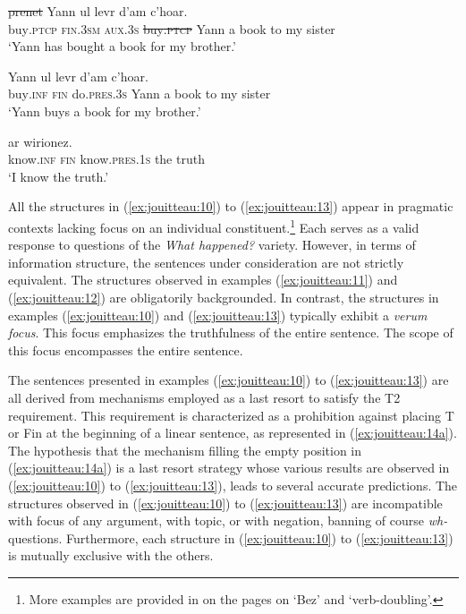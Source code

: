 \documentclass[output=paper,colorlinks,citecolor=brown]{langscibook}
\begin{document}
\ea \label{ex:jouitteau:11}
    \gll {} {}      {}     \sout{prenet}             Yann    ul levr   d'am   c’hoar. \\
        buy\textsc{.ptcp} \textsc{fin.3sm} \textsc{aux.3s}  \sout{buy\textsc{.ptcp}} Yann    a  book  {to my} sister  \\
    \glt `Yann has bought a book for my brother.'
    \z
          
\ea \label{ex:jouitteau:12}
    \gll {} {}     {} Yann ul levr  d'am   c’hoar.\\
        buy\textsc{.inf}   \textsc{fin} do\textsc{.pres.3s}  Yann   a  book {to my} sister \\
    \glt `Yann buys a book for my brother.' 

    \z 
     
\ea
 \label{ex:jouitteau:13}
\gll {} {}     {} ar wirionez.\\
know\textsc{.inf}  \textsc{fin} know\textsc{.pres.1s}  the truth \\
\glt `I know the truth.'
\z 

\noindent All the structures in (\ref{ex:jouitteau:10}) to (\ref{ex:jouitteau:13}) appear in pragmatic contexts lacking focus on an individual constituent.\footnote{More examples are provided in \citet{mj:Jouitteau2009} on the pages on ‘Bez’ and ‘verb-doubling’.} Each serves as a valid response to questions of the \textit{What happened?} variety. However, in terms of information structure, the sentences under consideration are not strictly equivalent. The structures observed in examples (\ref{ex:jouitteau:11}) and (\ref{ex:jouitteau:12}) are obligatorily backgrounded. In contrast, the structures in examples (\ref{ex:jouitteau:10}) and (\ref{ex:jouitteau:13}) typically exhibit a \textit{verum focus}. This focus emphasizes the truthfulness of the entire sentence. The scope of this focus encompasses the entire sentence. 

The sentences presented in examples (\ref{ex:jouitteau:10}) to (\ref{ex:jouitteau:13}) are all derived from mechanisms employed as a last resort to satisfy the T2 requirement. This requirement is characterized as a prohibition against placing T or Fin at the beginning of a linear sentence, as represented in (\ref{ex:jouitteau:14a}). The hypothesis that the mechanism filling the empty position in (\ref{ex:jouitteau:14a}) is a last resort strategy whose various results are observed in (\ref{ex:jouitteau:10}) to (\ref{ex:jouitteau:13}), leads to several accurate predictions. The structures observed in (\ref{ex:jouitteau:10}) to (\ref{ex:jouitteau:13}) are incompatible with focus of any argument, with topic, or with negation, banning of course \textit{wh-} questions. Furthermore, each structure in (\ref{ex:jouitteau:10}) to (\ref{ex:jouitteau:13}) is mutually exclusive with the others. 
\end{document}

